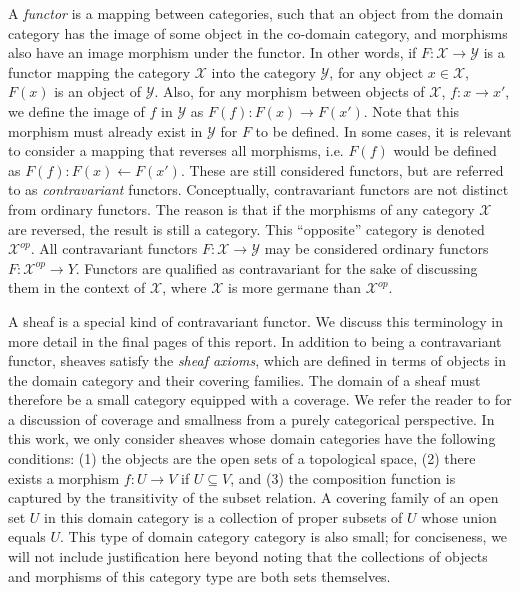 \documentclass{article}
\begin{document}
 A \emph{functor} is a mapping between categories, such
that an object from the domain category has the image of some object in the
co-domain category, and morphisms also have an image morphism under the
functor. In other words, if $F: \mathcal{X} \to \mathcal{Y}$ is a functor
mapping the category $\mathcal{X}$ into the category $\mathcal{Y}$, for any
object $x \in \mathcal{X}$, $F(x)$ is an object of $\mathcal{Y}$. Also, for any
morphism between objects of $\mathcal{X}$, $f: x \to x'$, we define the image
of $f$ in $\mathcal{Y}$ as $F(f) : F(x) \to F(x')$. Note that this morphism
must already exist in $\mathcal{Y}$ for $F$ to be defined. In some cases, it is
relevant to consider a mapping that reverses all morphisms, i.e. $F(f)$ would
be defined as $F(f): F(x) \leftarrow F(x')$.  These are still considered
functors, but are referred to as \emph{contravariant} functors.  Conceptually,
contravariant functors are not distinct from ordinary functors. The reason is
that if the morphisms of any category $\mathcal{X}$ are reversed, the result is
still a category. This ``opposite'' category is denoted $\mathcal{X}^{op}$.
All contravariant functors $F : \mathcal{X} \rightarrow \mathcal{Y}$ may be
considered ordinary functors $F : \mathcal{X}^{op} \rightarrow {Y}$. Functors
are qualified as contravariant for the sake of discussing them in the context
of $\mathcal{X}$, where $\mathcal{X}$ is more germane than $\mathcal{X}^{op}$.

 \label{sheafDef} A sheaf is a special kind of contravariant
functor. We discuss this terminology in more detail in the final pages of this
report.  In addition to being a contravariant functor, sheaves satisfy the
\emph{sheaf axioms}, which are defined in terms of objects in the domain
category and their covering families. The domain of a sheaf must therefore be a
small category equipped with a coverage. We refer the reader to
\cite{nlab:sheaf} for a discussion of coverage and smallness from a purely
categorical perspective. In this work, we only consider sheaves whose domain
categories have the following conditions: (1) the objects are the open sets of
a topological space, (2) there exists a morphism $f : U \rightarrow V$ if $U
\subseteq V$, and (3) the composition function is captured by the transitivity
of the subset relation. A covering family of an open set $U$ in this domain
category is a collection of proper subsets of $U$ whose union equals $U$. This
type of domain category category is also small; for conciseness, we will not
include justification here beyond noting that the collections of objects and
morphisms of this category type are both sets themselves. 
\end{document}
